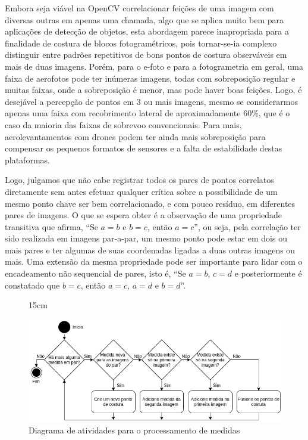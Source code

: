 Embora seja viável na OpenCV correlacionar feições de uma imagem com diversas outras em apenas uma chamada, algo que se aplica muito bem para aplicações de detecção de objetos, esta abordagem parece inapropriada para a finalidade de costura de blocos fotogramétricos, pois tornar-se-ia complexo distinguir entre padrões repetitivos de bons pontos de costura observáveis em mais de duas imagens. Porém, para o e-foto e para a fotogrametria em geral, uma faixa de aerofotos pode ter inúmeras imagens, todas com sobreposição regular e muitas faixas, onde a sobreposição é menor, mas pode haver boas feições. Logo, é desejável a percepção de pontos em 3 ou mais imagens, mesmo se considerarmos apenas uma faixa com recobrimento lateral de aproximadamente 60\%, que é o caso da maioria das faixas de sobrevoo convencionais. Para mais, aerolevantamentos com drones podem ter ainda mais sobreposição para compensar os pequenos formatos de sensores e a falta de estabilidade destas plataformas. 

Logo, julgamos que não cabe registrar todos os pares de pontos correlatos diretamente sem antes efetuar qualquer crítica sobre a possibilidade de um mesmo ponto chave ser bem correlacionado, e com pouco resíduo, em diferentes pares de imagens. O que se espera obter é a observação de uma propriedade transitiva que afirma, ``Se $a=b$ e $b=c$, então $a=c$'', ou seja, pela correlação ter sido realizada em imagens par-a-par, um mesmo ponto pode estar em dois ou mais pares e ter algumas de suas coordenadas ligadas a duas outras imagens ou mais. Uma extensão da mesma propriedade pode ser importante para lidar com o encadeamento não sequencial de pares, isto é, ``Se $a=b$, $c=d$ e posteriormente é constatado que $b=c$, então $a=c$, $a=d$ e $b=d$''.

\begin{figure}[!h]{15cm}
  \caption{Diagrama de atividades para o processamento de medidas} \label{fl:medidas}
  \includegraphics[width=\hsize]{figuras/fluxo_medidas.png}
\end{figure}


